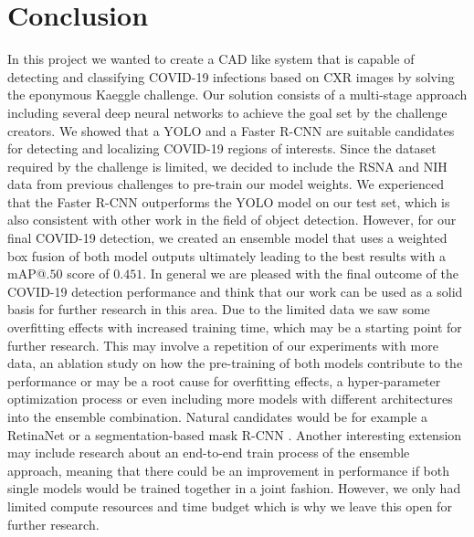 \chapter{Conclusion}\label{chapter:conclusion}

In this project we wanted to create a \ac{CAD} like system that is capable of detecting and classifying COVID-19 infections based on \acl{CXR} images by solving the eponymous Kaeggle challenge. Our solution consists of a multi-stage approach including several deep neural networks to achieve the goal set by the challenge creators. We showed that a \ac{YOLO} and a Faster \ac{R-CNN} are suitable candidates for detecting and localizing COVID-19 regions of interests. Since the dataset required by the challenge is limited, we decided to include the \ac{RSNA} and \ac{NIH} data from previous challenges to pre-train our model weights.
We experienced that the Faster \ac{R-CNN} outperforms the \ac{YOLO} model on our test set, which is also consistent with other work in the field of object detection. However, for our final COVID-19 detection, we created an ensemble model that uses a weighted box fusion of both model outputs ultimately leading to the best results with a \ac{mAP}@$.50$ score of $0.451$. In general we are pleased with the final outcome of the COVID-19 detection performance and think that our work can be used as a solid basis for further research in this area. Due to the limited data we saw some overfitting effects with increased training time, which may be a starting point for further research. This may involve a repetition of our experiments with more data, an ablation study on how the pre-training of both models contribute to the performance or may be a root cause for overfitting effects, a hyper-parameter optimization process or even including more models with different architectures into the ensemble combination. Natural candidates would be for example a RetinaNet \autocite{lin_focal_2018} or a segmentation-based mask R-CNN \autocite{maskRcnn}.
Another interesting extension may include research about an end-to-end train process of the ensemble approach, meaning that there could be an improvement in performance if both single models would be trained together in a joint fashion. However, we only had limited compute resources and time budget which is why we leave this open for further research.

